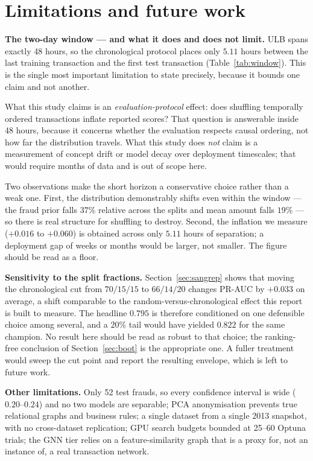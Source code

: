\documentclass[11pt,a4paper]{article}
\begin{document}
\section{Limitations and future work}

\textbf{The two-day window --- and what it does and does not limit.} ULB spans exactly 48 hours,
so the chronological protocol places only $5.11$ hours between the last training transaction and
the first test transaction (Table~\ref{tab:window}). This is the single most important limitation
to state precisely, because it bounds one claim and not another.

What this study claims is an \emph{evaluation-protocol} effect: does shuffling temporally ordered
transactions inflate reported scores? That question is answerable inside 48 hours, because it
concerns whether the evaluation respects causal ordering, not how far the distribution travels.
What this study does \emph{not} claim is a measurement of concept drift or model decay over
deployment timescales; that would require months of data and is out of scope here.

Two observations make the short horizon a conservative choice rather than a weak one. First, the
distribution demonstrably shifts even within the window --- the fraud prior falls $37\%$ relative
across the splits and mean amount falls $19\%$ --- so there is real structure for shuffling to
destroy. Second, the inflation we measure ($+0.016$ to $+0.060$) is obtained across only $5.11$
hours of separation; a deployment gap of weeks or months would be larger, not smaller. The figure
should be read as a floor.

\textbf{Sensitivity to the split fractions.} Section~\ref{sec:sangrep} shows that moving the
chronological cut from $70/15/15$ to $66/14/20$ changes PR-AUC by $+0.033$ on average, a shift
comparable to the random-versus-chronological effect this report is built to measure. The
headline $0.795$ is therefore conditioned on one defensible choice among several, and a
$20\%$ tail would have yielded $0.822$ for the same champion. No result here should be read as
robust to that choice; the ranking-free conclusion of Section~\ref{sec:boot} is the appropriate
one. A fuller treatment would sweep the cut point and report the resulting envelope, which is
left to future work.

\textbf{Other limitations.} Only 52 test frauds, so every confidence interval is wide
($0.20$--$0.24$) and no two models are separable; PCA anonymisation prevents true relational
graphs and business rules; a single dataset from a single 2013 snapshot, with no cross-dataset
replication; GPU search budgets bounded at 25--60 Optuna trials; the GNN tier relies on a
feature-similarity graph that is a proxy for, not an instance of, a real transaction network.
\end{document}
